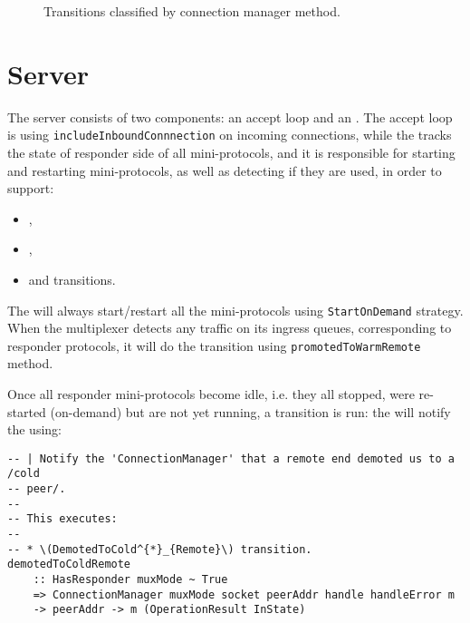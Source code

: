 \begin{figure}[p]
  \caption{Transitions classified by connection manager method.}
  \label{fig:methods}
\end{figure}

\section{Server}

The server consists of two components: an accept loop and an \inbgov{}.  The
accept loop is using \texttt{includeInboundConnnection} on incoming
connections, while the \inbgov{} tracks the state of responder side of all
mini-protocols, and it is responsible for starting and restarting
mini-protocols, as well as detecting if they are used, in order to support:

\begin{itemize}
  \item \PromotedToWarmDupRem{},
  \item \DemotedToColdUniRem{},
  \item \CommitUniRem{} and \CommitDupRem{} transitions.
\end{itemize}

The \inbgov{} will always start/restart all the mini-protocols using
\texttt{StartOnDemand} strategy.  When the multiplexer detects
any traffic on its ingress queues, corresponding to responder protocols,
it will do the \PromotedToWarmDupRem{} transition using
\texttt{promotedToWarmRemote} method.

Once all responder mini-protocols become idle, i.e. they all stopped, were
re-started (on-demand) but are not yet running, a \DemotedToColdAnyRem{}
transition is run: the \inbgov{} will notify the \connmngr{} using:

\begin{lstlisting}
-- | Notify the 'ConnectionManager' that a remote end demoted us to a /cold
-- peer/.
--
-- This executes:
--
-- * \(DemotedToCold^{*}_{Remote}\) transition.
demotedToColdRemote
    :: HasResponder muxMode ~ True
    => ConnectionManager muxMode socket peerAddr handle handleError m
    -> peerAddr -> m (OperationResult InState)
\end{lstlisting}

